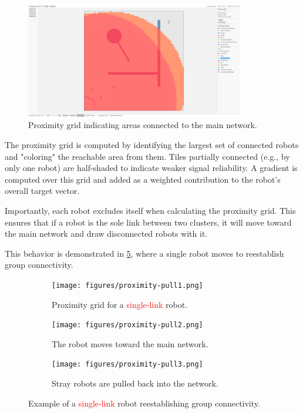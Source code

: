 \begin{figure}[h]
    \begin{center}
        \includegraphics[width=0.85\textwidth]{figures/screenshots/proximity-gradient.png}
    \end{center}
    \caption{Proximity grid indicating areas connected to the main network.}
    \label{fig:proximity-grid}
\end{figure}

The proximity grid is computed by identifying the largest set of connected robots and "coloring" the reachable area from them. Tiles partially connected (e.g., by only one robot) are half-shaded to indicate weaker signal reliability. A gradient is computed over this grid and added as a weighted contribution to the robot’s overall target vector.

Importantly, each robot excludes itself when calculating the proximity grid. This ensures that if a robot is the sole link between two clusters, it will move toward the main network and draw disconnected robots with it.

This behavior is demonstrated in \cref{fig:proximity-pull}, where a single robot moves to reestablish group connectivity.

\def\w{0.329\textwidth}
\begin{figure}[h]
    \begin{center}
        \begin{subfigure}[b]{\w}
            \centering
            \texttt{[image: figures/proximity-pull1.png]}
            \caption{Proximity grid for a \textcolor{red}{single-link} robot.}
            \label{fig:proximity-pull1}
        \end{subfigure}
        \begin{subfigure}[b]{\w}
            \centering
            \texttt{[image: figures/proximity-pull2.png]}
            \caption{The robot moves toward the main network.}
            \label{fig:proximity-pull2}
        \end{subfigure}
        \begin{subfigure}[b]{\w}
            \centering
            \texttt{[image: figures/proximity-pull3.png]}
            \caption{Stray robots are pulled back into the network.}
            \label{fig:proximity-pull3}
        \end{subfigure}
    \end{center}
    \caption{Example of a \textcolor{red}{single-link} robot reestablishing group connectivity.}
    \label{fig:proximity-pull}
\end{figure}


